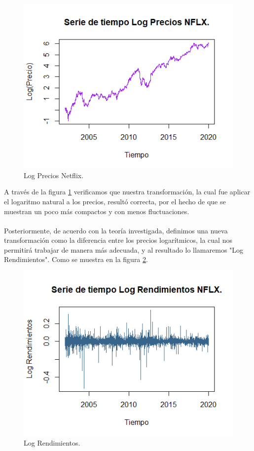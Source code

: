 \begin{figure}[!ht]
    \centering
    \includegraphics[scale=.70]{Graficos/LOGPRECIOSNFLT.png}
  \caption{Log Precios Netflix.}
    \label{Log Precios Netflix.}
\end{figure}
\newpage
A través de la figura \ref{Log Precios Netflix.} verificamos que nuestra transformación, la cual fue aplicar el logaritmo natural a los precios, resultó correcta, por el hecho de que se muestran un poco más compactos y con menos fluctuaciones.
\\\\
Posteriormente, de acuerdo con la teoría investigada, definimos una nueva transformación como la diferencia entre los precios logarítmicos, la cual nos permitirá trabajar de manera más adecuada, y al resultado lo llamaremos "Log Rendimientos". Como se muestra en la figura \ref{Log Rendimientos.}.

\begin{figure}[!ht]
    \centering
    \includegraphics[scale=.7]{Graficos/Rendimientos.png}
  \caption{Log Rendimientos.}
    \label{Log Rendimientos.}
\end{figure}

